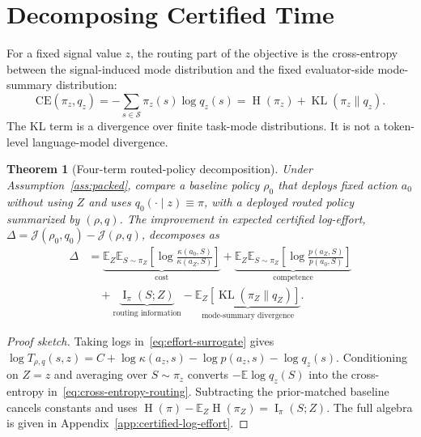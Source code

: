 \documentclass{article}
\newtheorem{theorem}{Theorem}
\DeclareMathOperator{\KL}{KL}
\DeclareMathOperator{\MI}{I}
\DeclareMathOperator{\Hent}{H}
\newcommand{\cS}{\mathcal{S}}
\newcommand{\E}{\mathbb{E}}
\newcommand{\J}{\mathcal{J}}
\begin{document}
\section{Decomposing Certified Time}
\label{sec:accounting}

For a fixed signal value $z$, the routing part of the objective is the cross-entropy between the signal-induced mode distribution and the fixed evaluator-side mode-summary distribution:
\begin{equation}
  \mathrm{CE}(\pi_z,q_z)
  =
  -\sum_{s\in\cS}\pi_z(s)\log q_z(s)
  =
  \Hent(\pi_z)+\KL(\pi_z\|q_z).
  \label{eq:cross-entropy-routing}
\end{equation}
The KL term is a divergence over finite task-mode distributions.
It is not a token-level language-model divergence.

\begin{theorem}[Four-term routed-policy decomposition]
\label{thm:four-term}
Under Assumption~\ref{ass:packed}, compare a baseline policy $\rho_0$ that deploys fixed action $a_0$ without using $Z$ and uses $q_0(\cdot\mid z)\equiv\pi$, with a deployed routed policy summarized by $(\rho,q)$.
The improvement in expected certified log-effort,
$\Delta=\J(\rho_0,q_0)-\J(\rho,q)$, decomposes as
\begin{equation}
\label{eq:four-term}
\begin{aligned}
  \Delta
  &=
  \underbrace{\E_Z\E_{S\sim\pi_Z}\!\left[\log\frac{\kappa(a_0,S)}{\kappa(a_Z,S)}\right]}_{\text{cost}}
  +
  \underbrace{\E_Z\E_{S\sim\pi_Z}\!\left[\log\frac{p(a_Z,S)}{p(a_0,S)}\right]}_{\text{competence}}
  \\
  &\quad+
  \underbrace{\MI_\pi(S;Z)}_{\text{routing information}}
  -
  \underbrace{\E_{Z}\!\left[\KL(\pi_{Z}\|q_{Z})\right]}_{\text{mode-summary divergence}} .
\end{aligned}
\end{equation}
\end{theorem}

\begin{proof}[Proof sketch]
Taking logs in~\eqref{eq:effort-surrogate} gives
$\log T_{\rho,q}(s,z)=C+\log\kappa(a_z,s)-\log p(a_z,s)-\log q_z(s)$.
Conditioning on $Z=z$ and averaging over $S\sim\pi_z$ converts
$-\E\log q_z(S)$ into the cross-entropy in~\eqref{eq:cross-entropy-routing}.
Subtracting the prior-matched baseline cancels constants and uses
$\Hent(\pi)-\E_Z\Hent(\pi_Z)=\MI_\pi(S;Z)$.
The full algebra is given in Appendix~\ref{app:certified-log-effort}.
\end{proof}
\end{document}
